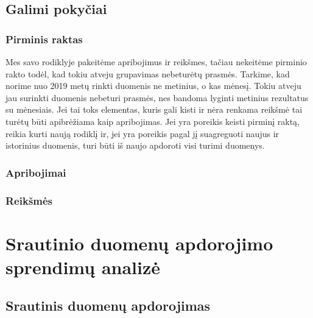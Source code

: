 \documentclass{VUMIFPSbakalaurinis}
\begin{document}
\subsection{Galimi pokyčiai}

\subsubsection{Pirminis raktas}
Mes savo rodiklyje pakeitėme apribojimus ir reikšmes, tačiau nekeitėme pirminio rakto todėl, kad tokiu atveju grupavimas nebeturėtų prasmės. Tarkime, kad norime nuo 2019 metų rinkti duomenis ne metinius, o kas mėnesį. Tokiu atveju jau surinkti duomenis nebeturi prasmės, nes bandoma lyginti metinius rezultatus su mėnesiais. Jei tai toks elementas, kuris gali kisti ir nėra renkama reikšmė tai turėtų būti apibrėžiama kaip apribojimas. Jei yra poreikis keisti pirminį raktą, reikia kurti naują rodiklį ir, jei yra poreikis pagal jį suagreguoti naujus ir istorinius duomenis, turi būti iš naujo apdoroti visi turimi duomenys.     

\subsubsection{Apribojimai}

\subsubsection{Reikšmės}

\section{Srautinio duomenų apdorojimo sprendimų analizė}

\subsection{Srautinis duomenų apdorojimas} \label{strprocess}
\end{document}
